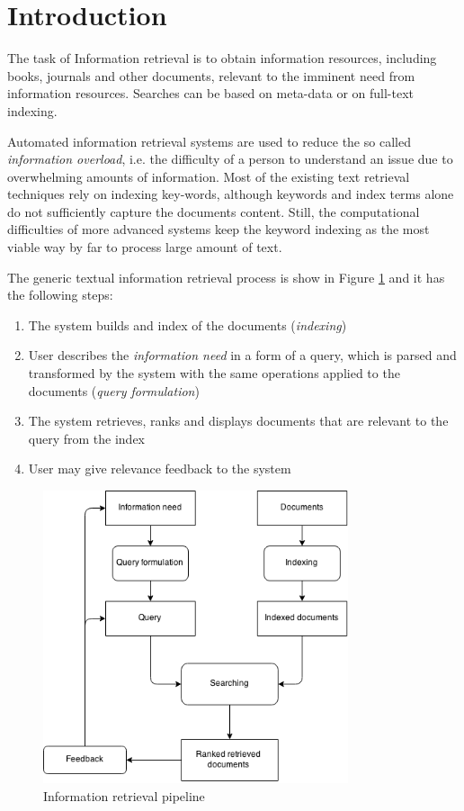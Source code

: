 \section{Introduction}

The task of Information retrieval is to obtain information resources, including books, journals and other documents, relevant to the imminent need from information resources. Searches can be based on meta-data or on full-text indexing.

Automated information retrieval systems are used to reduce the so called \textit{information overload}, i.e. the difficulty of a person to understand an issue due to overwhelming amounts of information. Most of the existing text retrieval techniques rely on indexing key-words, although keywords and index terms alone do not sufficiently capture the documents content. Still, the computational difficulties of more advanced systems keep the keyword indexing as the most viable way by far to process large amount of text. 

The generic textual information retrieval process is show in Figure \ref{fig:IR} and it has the following steps:
\begin{enumerate}
  \item The system builds and index of the documents (\textit{indexing}) 
  \item User describes the \textit{information need} in a form of a query, which is parsed and transformed by the system with the same operations applied to the documents (\textit{query formulation})
  \item The system retrieves, ranks and displays documents that are relevant to the query from the index
  \item User may give relevance feedback to the system
\end{enumerate}
\begin{figure}[ht]
	\centering
	\includegraphics[width=0.8\textwidth]{IR.png}
	\caption{Information retrieval pipeline \citep{hiemstra2009information}}
	\label{fig:IR}
\end{figure}
\FloatBarrier

